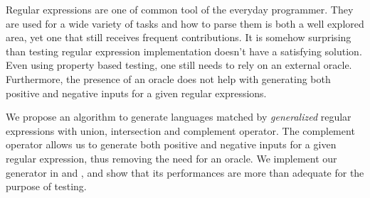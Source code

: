 Regular expressions are one of common tool of the everyday programmer.
They are used for a wide variety of tasks and how to parse them is both
a well explored area, yet one that still receives frequent contributions.
It is somehow surprising than testing regular expression implementation
doesn't have a satisfying solution. Even using property based testing, one
still needs to rely on an external oracle. Furthermore,
the presence of an oracle does not help with generating both positive and
negative inputs for a given regular expressions.

We propose an algorithm to generate languages matched by \emph{generalized}
regular expressions with union, intersection and complement operator.
The complement operator allows us to generate both positive and negative inputs
for a given regular expression, thus removing the need for an oracle.
We implement our generator in \haskell and \ocaml,
and show that its performances are more than
adequate for the purpose of testing.

